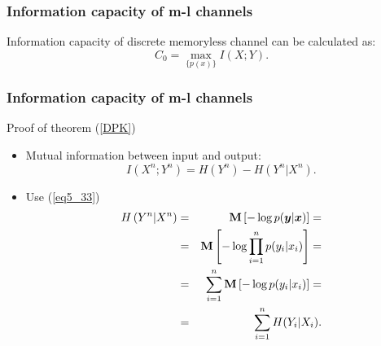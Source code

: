 \documentclass[14pt]{beamer}
\renewcommand{\vec}[1]{\ensuremath{\boldsymbol{#1}}}
\begin{document}
\begin{frame}
\frametitle{Information capacity of m-l channels}
\begin{itemize}

    \begin{theorem}%
    \label{DPK}
    Information capacity of discrete memoryless channel can be calculated as:
    \begin{equation}
    \label{eq5_35} C_0 = \mathop {\max }\limits_{\{p(x)\}} I(X;Y).
    \end{equation}
    \end{theorem}

\end{itemize}
\end{frame}


\begin{frame}
\frametitle{Information capacity of m-l channels}

Proof of theorem (\ref{DPK})
\begin{itemize}


    \item Mutual information between input and output:
    \begin{equation}
    \label{eq5_36} I\left( {X^n;Y^n} \right) = H\left( {Y^n} \right) -
    H\left( {Y^n\vert X^n} \right).
    \end{equation}
    
    \item Use (\ref{eq5_33})
    \small {
    \begin{eqnarray*}
    H\left( {Y^n\vert X^n} \right) &=& {\rm {\bf M}}\left[ { - \log
    p(\vec y\vert {\vec x})} \right] =\\
     &=& {\rm {\bf M}}\left[ { - \log \prod\limits_{i = 1}^n {p(y_i \vert x_i )} }
    \right] =\\
    &=&\sum\limits_{i = 1}^n {{\rm {\bf M}}\left[ { - \log p(y_i \vert
    x_i )} \right]} =\\
    & =& \sum\limits_{i = 1}^n {H(Y_i \vert X_i )} .
    \end{eqnarray*}
    }

\end{itemize}
\end{frame}
\end{document}
